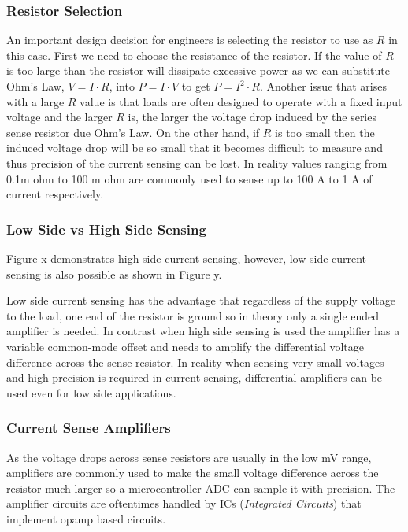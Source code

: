 \documentclass[main.tex]{subfiles}
\begin{document}
\subsubsection{Resistor Selection}
An important design decision for engineers is selecting the resistor to use as $R$ in this case. First we need to choose the resistance of the resistor. If the value of $R$ is too large than the resistor will dissipate excessive power as we can substitute Ohm's Law, $V=I \cdot R$, into $P=I \cdot V$ to get $P=I^{2} \cdot R$. Another issue that arises with a large $R$ value is that loads are often designed to operate with a fixed input voltage and the larger $R$ is, the larger the voltage drop induced by the series sense resistor due Ohm's Law. On the other hand, if $R$ is too small then the induced voltage drop will be so small that it becomes difficult to measure and thus precision of the current sensing can be lost. In reality values ranging from 0.1m ohm to 100 m ohm are commonly used to sense up to 100 A to 1 A of current respectively.

\subsubsection{Low Side vs High Side Sensing}
Figure x demonstrates high side current sensing, however, low side current sensing is also possible as shown in Figure y.


Low side current sensing has the advantage that regardless of the supply voltage to the load, one end of the resistor is ground so in theory only a single ended amplifier is needed. In contrast when high side sensing is used the amplifier has a variable common-mode offset and needs to amplify the differential voltage difference across the sense resistor. In reality when sensing very small voltages and high precision is required in current sensing, differential amplifiers can be used even for low side applications.

\subsubsection{Current Sense Amplifiers}
As the voltage drops across sense resistors are usually in the low mV range, amplifiers are commonly used to make the small voltage difference across the resistor much larger so a microcontroller ADC can sample it with precision. The amplifier circuits are oftentimes handled by ICs (\textit{Integrated Circuits}) that implement opamp based circuits. 
\end{document}
